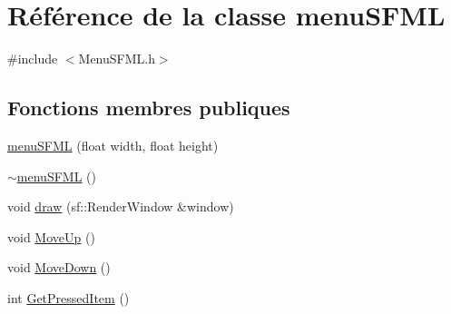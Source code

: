 \hypertarget{classmenu_s_f_m_l}{}\section{Référence de la classe menu\+S\+F\+ML}
\label{classmenu_s_f_m_l}


{\ttfamily \#include $<$Menu\+S\+F\+M\+L.\+h$>$}

\subsection*{Fonctions membres publiques}
\begin{DoxyCompactItemize}
\item 
\hyperlink{classmenu_s_f_m_l_a046b036ce16166e648d6e0fd1e570309}{menu\+S\+F\+ML} (float width, float height)
\item 
\hyperlink{classmenu_s_f_m_l_a493574f6783336630a6dd72e4b2d09c5}{$\sim$menu\+S\+F\+ML} ()
\item 
void \hyperlink{classmenu_s_f_m_l_accb46996f669892b3dac7b55c609b33f}{draw} (sf\+::\+Render\+Window \&window)
\item 
void \hyperlink{classmenu_s_f_m_l_a3bc838a2dcc14dbb6fcb3d1691fe567c}{Move\+Up} ()
\item 
void \hyperlink{classmenu_s_f_m_l_af02ba261796ed0ac33eaf1049a9a7e4d}{Move\+Down} ()
\item 
int \hyperlink{classmenu_s_f_m_l_a3205ea9e140f80b7dfc8401bb81bd631}{Get\+Pressed\+Item} ()
\end{DoxyCompactItemize}
